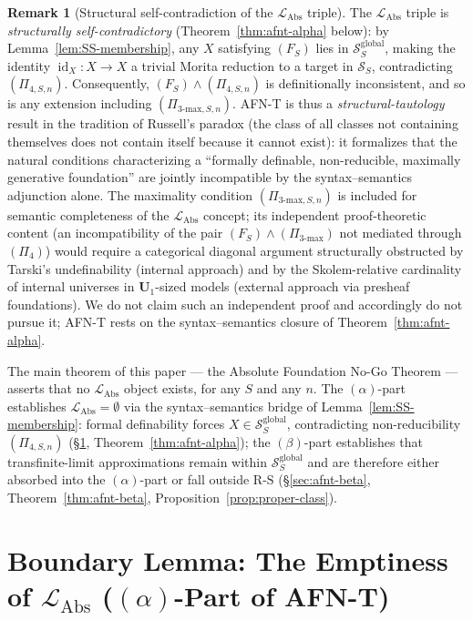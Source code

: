 \documentclass[11pt]{article}
\theoremstyle{plain}
\theoremstyle{definition}
\newtheorem{remark}[theorem]{Remark}
\newcommand{\RS}{\mathrm{R\text{-}S}}
\newcommand{\cS}{\mathcal{S}}
\newcommand{\LAbs}{\mathcal{L}_{\mathrm{Abs}}}
\DeclareMathOperator{\id}{id}
\begin{document}
\begin{remark}[Structural self-contradiction of the $\LAbs$ triple]\label{rem:level6-tautology}
The $\LAbs$ triple is \emph{structurally self-contradictory} (Theorem~\ref{thm:afnt-alpha} below): by Lemma~\ref{lem:SS-membership}, any $X$ satisfying $(F_S)$ lies in $\cS_S^{\mathrm{global}}$, making the identity $\id_X : X \to X$ a trivial Morita reduction to a target in $\cS_S$, contradicting $(\Pi_{4, S, n})$. Consequently, $(F_S) \wedge (\Pi_{4, S, n})$ is definitionally inconsistent, and so is any extension including $(\Pi_{3\text{-max}, S, n})$. AFN-T is thus a \emph{structural-tautology} result in the tradition of Russell's paradox (the class of all classes not containing themselves does not contain itself because it cannot exist): it formalizes that the natural conditions characterizing a ``formally definable, non-reducible, maximally generative foundation'' are jointly incompatible by the syntax--semantics adjunction alone. The maximality condition $(\Pi_{3\text{-max}, S, n})$ is included for semantic completeness of the $\LAbs$ concept; its independent proof-theoretic content (an incompatibility of the pair $(F_S) \wedge (\Pi_{3\text{-max}})$ not mediated through $(\Pi_4)$) would require a categorical diagonal argument structurally obstructed by Tarski's undefinability (internal approach) and by the Skolem-relative cardinality of internal universes in $\mathbf{U}_1$-sized models (external approach via presheaf foundations). We do not claim such an independent proof and accordingly do not pursue it; AFN-T rests on the syntax--semantics closure of Theorem~\ref{thm:afnt-alpha}.
\end{remark}

The main theorem of this paper --- the Absolute Foundation No-Go Theorem --- asserts that no $\LAbs$ object exists, for any $S$ and any $n$. The $(\alpha)$-part establishes $\LAbs = \emptyset$ via the syntax--semantics bridge of Lemma~\ref{lem:SS-membership}: formal definability forces $X \in \cS_S^{\mathrm{global}}$, contradicting non-reducibility $(\Pi_{4, S, n})$ (\S\ref{sec:afnt-alpha}, Theorem~\ref{thm:afnt-alpha}); the $(\beta)$-part establishes that transfinite-limit approximations remain within $\cS_S^{\mathrm{global}}$ and are therefore either absorbed into the $(\alpha)$-part or fall outside $\RS$ (\S\ref{sec:afnt-beta}, Theorem~\ref{thm:afnt-beta}, Proposition~\ref{prop:proper-class}).

\section{\texorpdfstring{Boundary Lemma: The Emptiness of $\LAbs$ ($(\alpha)$-Part of AFN-T)}{Boundary Lemma: The Emptiness of L\_Abs ((alpha)-Part of AFN-T)}}\label{sec:afnt-alpha}
\end{document}
